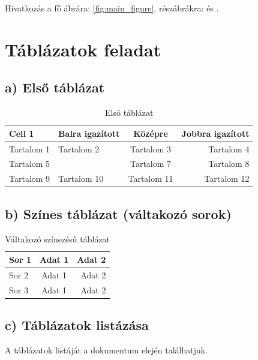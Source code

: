 \documentclass[a4paper,12pt]{article}
\begin{document}
Hivatkozás a fő ábrára: \ref{fig:main_figure}, részábrákra:  és .

\newpage

\section{Táblázatok feladat}

\subsection{a) Első táblázat}
\begin{table}[h]
    \centering
    \begin{tabular}{|p{30pt}|l|c|r|}
        \hline
        Cell 1 & Balra igazított & Középre & Jobbra igazított \\ \hline
        Tartalom 1 & Tartalom 2 & Tartalom 3 & Tartalom 4 \\ \hline
        Tartalom 5 & & Tartalom 7 & Tartalom 8 \\ \hline
        Tartalom 9 & Tartalom 10 & Tartalom 11 & Tartalom 12 \\ \hline
    \end{tabular}
    \caption{Első táblázat}
    \label{tab:table1}
\end{table}

\subsection{b) Színes táblázat (váltakozó sorok)}
\begin{table}[h]
    \centering
    \begin{tabular}{|l|c|r|}
        \hline
        Sor 1 & Adat 1 & Adat 2 \\ \hline
        Sor 2 & Adat 1 & Adat 2 \\ \hline
        Sor 3 & Adat 1 & Adat 2 \\ \hline
    \end{tabular}
    \caption{Váltakozó színezésű táblázat}
\end{table}

\subsection{c) Táblázatok listázása}
A táblázatok listáját a dokumentum elején találhatjuk.
\end{document}
